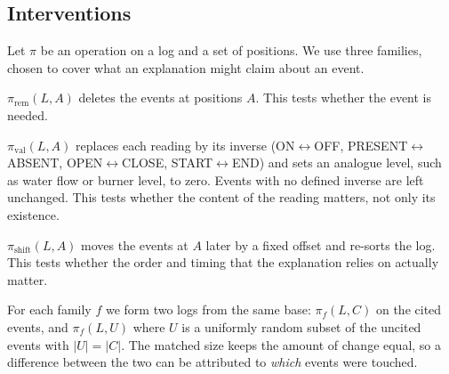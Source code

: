 \documentclass[11pt,a4paper]{article}
\begin{document}
\subsection{Interventions}
Let $\pi$ be an operation on a log and a set of positions. We use three families, chosen to cover what an explanation might claim about an event.
\begin{description}[leftmargin=1.2cm,style=nextline]
\item[Removal.] $\pi_{\mathrm{rem}}(L,A)$ deletes the events at positions $A$. This tests whether the event is needed.
\item[Value change.] $\pi_{\mathrm{val}}(L,A)$ replaces each reading by its inverse (ON$\leftrightarrow$OFF, PRESENT$\leftrightarrow$ABSENT, OPEN$\leftrightarrow$CLOSE, START$\leftrightarrow$END) and sets an analogue level, such as water flow or burner level, to zero. Events with no defined inverse are left unchanged. This tests whether the content of the reading matters, not only its existence.
\item[Temporal shift.] $\pi_{\mathrm{shift}}(L,A)$ moves the events at $A$ later by a fixed offset and re-sorts the log. This tests whether the order and timing that the explanation relies on actually matter.
\end{description}
For each family $f$ we form two logs from the same base: $\pi_f(L,C)$ on the cited events, and $\pi_f(L,U)$ where $U$ is a uniformly random subset of the uncited events with $|U|=|C|$. The matched size keeps the amount of change equal, so a difference between the two can be attributed to \emph{which} events were touched.
\end{document}

